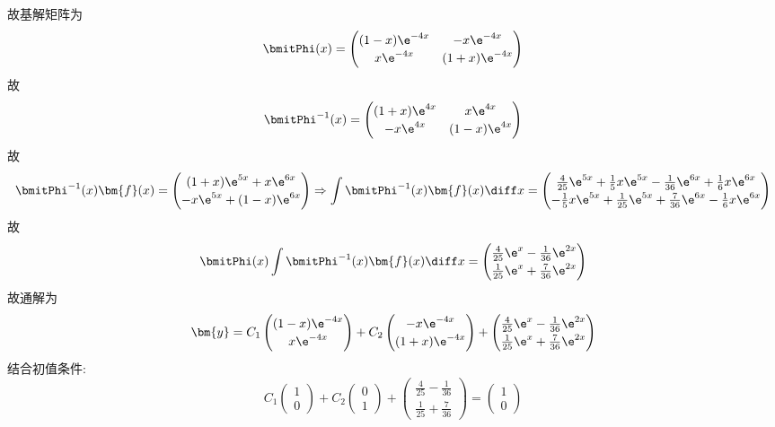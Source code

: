 \begin{solve}
故基解矩阵为
\[\bmitPhi(x)=\begin{pmatrix}(1-x)\e^{-4x}&-x\e^{-4x}\\x\e^{-4x}&(1+x)\e^{-4x}\end{pmatrix}\]
故
\[\bmitPhi^{-1}(x)=\begin{pmatrix}(1+x)\e^{4x}&x\e^{4x}\\-x\e^{4x}&(1-x)\e^{4x}\end{pmatrix}\]
故
\[\bmitPhi^{-1}(x)\bm{f}(x)=\begin{pmatrix}(1+x)\e^{5x}+x\e^{6x}\\-x\e^{5x}+(1-x)\e^{6x}\end{pmatrix}\Rightarrow\int\bmitPhi^{-1}(x)\bm{f}(x)\diff x=
\renewcommand\arraystretch{1.2}\begin{pmatrix}\frac{4}{25}\e^{5x}+\frac{1}{5}x\e^{5x}-\frac{1}{36}\e^{6x}+\frac{1}{6}x\e^{6x}\\-\frac{1}{5}x\e^{5x}+\frac{1}{25}\e^{5x}+\frac{7}{36}\e^{6x}-\frac{1}{6}x\e^{6x}\end{pmatrix}\]
故
\[\bmitPhi(x)\int\bmitPhi^{-1}(x)\bm{f}(x)\diff x=
\renewcommand\arraystretch{1.2}\begin{pmatrix}\frac{4}{25}\e^x-\frac{1}{36}\e^{2x}\\\frac{1}{25}\e^x+\frac{7}{36}\e^{2x}\end{pmatrix}\]
故通解为
\[\bm{y}=C_1\begin{pmatrix}(1-x)\e^{-4x}\\x\e^{-4x}\end{pmatrix}+C_2\begin{pmatrix}-x\e^{-4x}\\(1+x)\e^{-4x}\end{pmatrix}+\renewcommand\arraystretch{1.2}\begin{pmatrix}\frac{4}{25}\e^x-\frac{1}{36}\e^{2x}\\\frac{1}{25}\e^x+\frac{7}{36}\e^{2x}\end{pmatrix}\]
结合初值条件:
\[C_1\begin{pmatrix}1\\0\end{pmatrix}+C_2\begin{pmatrix}0\\1\end{pmatrix}+\begin{pmatrix}\frac{4}{25}-\frac{1}{36}\\\frac{1}{25}+\frac{7}{36}\end{pmatrix}=\begin{pmatrix}1\\0\end{pmatrix}\]

\end{solve}
